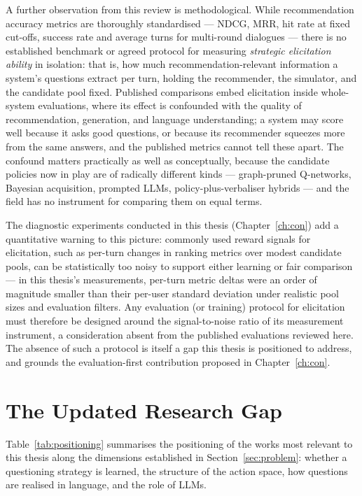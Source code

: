 A further observation from this review is methodological. While recommendation accuracy metrics are thoroughly standardised — NDCG, MRR, hit rate at fixed cut-offs, success rate and average turns for multi-round dialogues — there is no established benchmark or agreed protocol for measuring \textit{strategic elicitation ability} in isolation: that is, how much recommendation-relevant information a system's questions extract per turn, holding the recommender, the simulator, and the candidate pool fixed. Published comparisons embed elicitation inside whole-system evaluations, where its effect is confounded with the quality of recommendation, generation, and language understanding; a system may score well because it asks good questions, or because its recommender squeezes more from the same answers, and the published metrics cannot tell these apart. The confound matters practically as well as conceptually, because the candidate policies now in play are of radically different kinds — graph-pruned Q-networks, Bayesian acquisition, prompted LLMs, policy-plus-verbaliser hybrids — and the field has no instrument for comparing them on equal terms.

The diagnostic experiments conducted in this thesis (Chapter~\ref{ch:con}) add a quantitative warning to this picture: commonly used reward signals for elicitation, such as per-turn changes in ranking metrics over modest candidate pools, can be statistically too noisy to support either learning or fair comparison — in this thesis's measurements, per-turn metric deltas were an order of magnitude smaller than their per-user standard deviation under realistic pool sizes and evaluation filters. Any evaluation (or training) protocol for elicitation must therefore be designed around the signal-to-noise ratio of its measurement instrument, a consideration absent from the published evaluations reviewed here. The absence of such a protocol is itself a gap this thesis is positioned to address, and grounds the evaluation-first contribution proposed in Chapter~\ref{ch:con}.

\section{The Updated Research Gap}
\label{sec:gap}

Table~\ref{tab:positioning} summarises the positioning of the works most relevant to this thesis along the dimensions established in Section~\ref{sec:problem}: whether a questioning strategy is learned, the structure of the action space, how questions are realised in language, and the role of LLMs.

